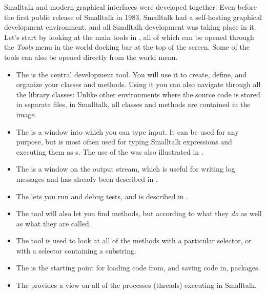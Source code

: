 \documentclass[a4paper,10pt,twoside]{book}
\begin{document}
Smalltalk and modern graphical interfaces were developed together.
Even before the first public release of Smalltalk in 1983, Smalltalk had a self-hosting graphical development environment, and all Smalltalk development was taking place in it.
Let's start by looking at the main tools in \Squeak, all of which can be opened through the \emph{Tools} menu in the world docking bar at the top of the screen. Some of the tools can also be opened directly from the world menu.

\begin{itemize}
	\item {The } is the central development tool.
		You will use it to create, define, and organize your classes and methods.
		Using it you can also navigate through all the library classes:
		Unlike other environments where the source code is stored in separate files, in Smalltalk, all classes and methods are contained in the image.

	\item{The } is a window into which you can type input.
		It can be used for any purpose, but is most often used for typing Smalltalk expressions and executing them as s.
		The use of the  was also illustrated in .

	\item{The } is a window on the  output stream, which is useful for writing log messages and has already been described in .

	\item{The } lets you run and debug \SUnit tests, and is described in .

	\item{The } tool will also let you find methods, but according to what they \emph{do} as well as what they are called.

	\item{The } tool is used to look at all of the methods with a particular selector, or with a selector containing a substring.

	\item{The } is the starting point for loading code from, and saving code in,  packages.

	\item{The  provides a view on all of the processes (threads) executing in Smalltalk.}
\end{itemize}
\end{document}
